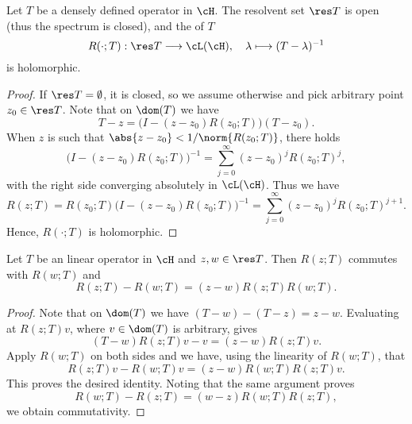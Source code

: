 \documentclass[oneside,reqno,letterpaper]{amsart}
\begin{document}
\begin{theorem}
\label{thm:resolvent-properties}
  Let \(T\) be a densely defined operator in \(\cH\). 
  The resolvent set \(\res T\) is open (thus the spectrum is closed), and the  of \(T\)
  \[
    R(\cdot; T): \res T \longrightarrow \cL(\cH), \quad \lambda \longmapsto (T - \lambda)^{-1}
  \] 
  is holomorphic. 
\end{theorem}
\begin{proof}
  If \(\res T = \emptyset\), it is closed, so we assume otherwise and pick arbitrary point  \(z_0 \in \res T\). 
  Note that on \(\dom(T)\) we have 
  \[
    T - z = \Big( I - (z - z_0) R(z_0; T) \Big) (T - z_0) . 
  \] 
  When \(z\) is such that \(\abs{z - z_0} < 1 / \norm{R(z_0; T)}\), there holds
  \[
    \big( I - (z - z_0) R(z_0; T) \big)^{-1} = \sum_{j = 0}^{\infty} (z - z_0)^j R(z_0; T)^j , 
  \] 
  with the right side converging absolutely in \(\cL(\cH)\).
  Thus we have 
  \[
    R(z; T) 
    = R(z_0; T) \big( I - (z - z_0) R(z_0; T) \big)^{-1} 
    = \sum_{j = 0}^{\infty} (z - z_0)^j R(z_0; T)^{j + 1} . 
  \] 
  Hence, \(R(\cdot; T)\) is holomorphic.
\end{proof}


\begin{theorem}
\label{thm:resolvent-identities}
  Let \(T\) be an linear operator in \(\cH\) and \(z, w \in \res T\). 
  Then \(R(z; T)\) commutes with \(R(w; T)\) and 
  \[
    R(z; T) - R(w; T) = (z - w) R(z; T) R(w; T) . 
  \] 
\end{theorem}

\begin{proof}
  Note that on \(\dom(T)\) we have \((T - w) - (T - z) = z - w\). 
  Evaluating at \(R(z; T) v\), where \(v \in \dom(T)\) is arbitrary, gives 
  \[
    (T - w) R(z; T) v - v = (z - w) R(z; T) v . 
  \] 
  Apply \(R(w; T)\) on both sides and we have, using the linearity of \(R(w; T)\), that 
  \[
    R(z; T) v - R(w; T) v = (z - w) R(w; T) R(z; T) v . 
  \] 
  This proves the desired identity. 
  Noting that the same argument proves
  \[
    R(w; T) - R(z; T) = (w - z) R(w; T) R(z; T) , 
  \] 
  we obtain commutativity. 
\end{proof}
\end{document}
